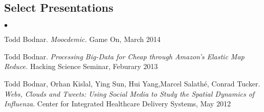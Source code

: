 \documentclass[margin,line]{res}
\newenvironment{list2}{
  \begin{list}{$\bullet$}{%
      \setlength{\itemsep}{0in}
      \setlength{\parsep}{0in} \setlength{\parskip}{0in}
      \setlength{\topsep}{0in} \setlength{\partopsep}{0in} 
      \setlength{\leftmargin}{10pt}}}{\end{list}}
\begin{document}
\begin{resume}
\section{\sc Select Presentations}
\begin{list2}
\item Todd Bodnar. \textit{Moocdemic.} Game On, March 2014
\item Todd Bodnar. \textit{Processing Big-Data for Cheap through Amazon's Elastic Map Reduce.} Hacking Science Seminar, Feburary 2013
\item Todd Bodnar, Orhan Kislal, Ying Sun, Hui Yang,Marcel Salath\'e, Conrad 
Tucker. \textit{Webs, Clouds and Tweets: Using Social Media to Study the Spatial Dynamics of Influenza}. Center for Integrated Healthcare Delivery Systems, May 2012 
\end{list2}

%




\end{resume}
\end{document}
